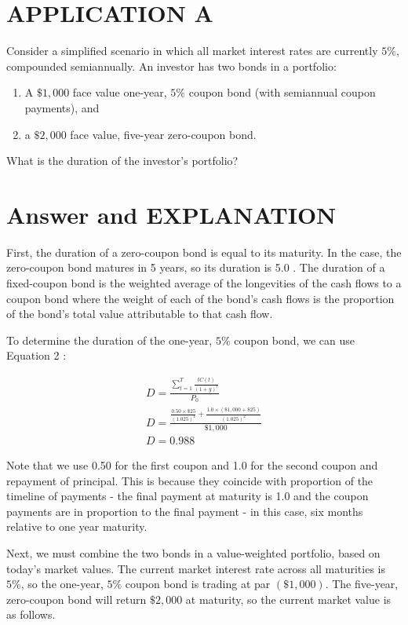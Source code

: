 \documentclass[11pt]{article}
\begin{document}
\section*{APPLICATION A}
Consider a simplified scenario in which all market interest rates are currently $5 \%$, compounded semiannually. An investor has two bonds in a portfolio:

\begin{enumerate}
  \item A $\$ 1,000$ face value one-year, $5 \%$ coupon bond (with semiannual coupon payments), and

  \item a $\$ 2,000$ face value, five-year zero-coupon bond.

\end{enumerate}

What is the duration of the investor's portfolio?

\section*{Answer and EXPLANATION}
First, the duration of a zero-coupon bond is equal to its maturity. In the case, the zero-coupon bond matures in 5 years, so its duration is 5.0 . The duration of a fixed-coupon bond is the weighted average of the longevities of the cash flows to a coupon bond where the weight of each of the bond's cash flows is the proportion of the bond's total value attributable to that cash flow.

To determine the duration of the one-year, $5 \%$ coupon bond, we can use Equation 2 :

$$
\begin{gathered}
D=\frac{\sum_{t=1}^{T} \frac{t C(t)}{(1+y)^{t}}}{P_{0}} \\
D=\frac{\frac{0.50 \times \$ 25}{(1.025)^{1}}+\frac{1.0 \times(\$ 1,000+\$ 25)}{(1.025)^{2}}}{\$ 1,000} \\
D=0.988
\end{gathered}
$$

Note that we use 0.50 for the first coupon and 1.0 for the second coupon and repayment of principal. This is because they coincide with proportion of the timeline of payments - the final payment at maturity is 1.0 and the coupon payments are in proportion to the final payment - in this case, six months relative to one year maturity.

Next, we must combine the two bonds in a value-weighted portfolio, based on today's market values. The current market interest rate across all maturities is $5 \%$, so the one-year, $5 \%$ coupon bond is trading at par $(\$ 1,000)$. The five-year, zero-coupon bond will return $\$ 2,000$ at maturity, so the current market value is as follows.
\end{document}
